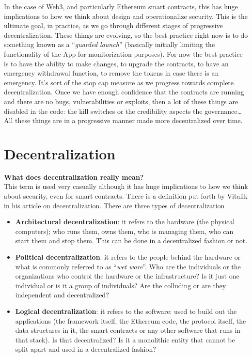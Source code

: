 In the case of Web3, and particularly Ethereum smart contracts, this has huge implications to how we think about design and operationalize security.
This is the ultimate goal, in practice, as we go through different stages of progressive decentralization.
These things are evolving, so the best practice right now is to do something known as a ``\textit{guarded launch}'' (basically initially limiting the functionality of the \DJ App for monitorization purposes).
For now the best practice is to have the ability to make changes, to upgrade the contracts, to have an emergency withdrawal function, to remove the tokens in case there is an emergency.
It's sort of the stop cap measure as we progress towards complete decentralization.
Once we have enough confidence that the contracts are running and there are no bugs, vulnerabilities or exploits, then a lot of these things are disabled in the code: the kill switches or the credibility aspects the governance\dots\\

All these things are in a progressive manner made more decentralized over time.

\section{Decentralization}

\textbf{What does decentralization really mean?}\\

This term is used very casually although it has huge implications to how we think about security, even for smart contracts.
There is a definition put forth by Vitalik in his article on decentralization.
There are three types of decentralization

\begin{itemize}

    \item\textbf{Architectural decentralization}: it refers to the hardware (the physical computers); who runs them, owns them, who is managing them, who can start them and stop them.
    This can be done in a decentralized fashion or not.

    \item\textbf{Political decentralization}: it refers to the people behind the hardware or what is commonly referred to as ``\textit{wet ware}''.
    Who are the individuals or the organizations who control the hardware or the infrastructure?
    Is it just one individual or is it a group of individuals?
    Are the colluding or are they independent and decentralized?

    \item\textbf{Logical decentralization}: it refers to the software: used to build out the applications (the framework itself, the Ethereum code, the protocol itself, the data structures in it, the smart contracts or any other software that runs in that stack).
    Is that decentralized?
    Is it a monolithic entity that cannot be split apart and used in a decentralized fashion?

\end{itemize}

